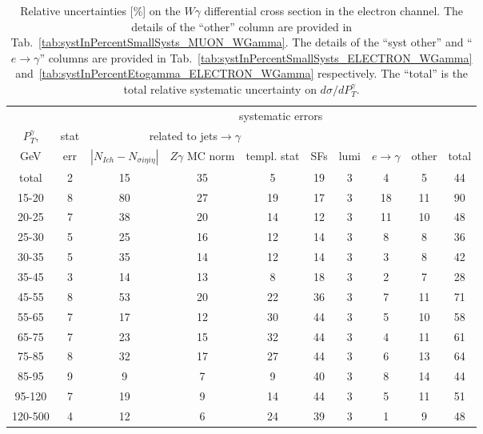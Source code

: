 \begin{table}[h]
  \scriptsize
  \begin{center}
  \caption{Relative uncertainties [\%] on the $W\gamma$ differential cross section in the electron channel. The details of the ``other'' column are provided in Tab.~\ref{tab:systInPercentSmallSysts_MUON_WGamma}. The details of the ``syst other'' and ``$e\rightarrow\gamma$'' columns are provided in Tab.~\ref{tab:systInPercentSmallSysts_ELECTRON_WGamma} and~\ref{tab:systInPercentEtogamma_ELECTRON_WGamma} respectively. The ``total'' is the total relative systematic uncertainty on $d\sigma/dP_T^{\gamma}$.}
   \begin{tabular}{|c|c|c|c|c|c|c|c|c|c|}
   \hline
                   &     & \multicolumn{8}{|c|}{systematic errors}     \\
    $P_T^{\gamma}$,  & stat & \multicolumn{3}{|c|}{related to jets$\rightarrow\gamma$} &  &  &  &  & \\
    GeV           & err & $|N_{Ich}-N_{\sigma{i\eta i\eta}}|$ &$Z\gamma$ MC norm &templ. stat & SFs & lumi & $e\rightarrow\gamma$  & other & total\\ \hline
    total  & 2 & 15 & 35 & 5 & 19 & 3 & 4 & 5 & 44 \\ \hline
    15-20 & 8 & 80 & 27 & 19 & 17 & 3 & 18 & 11 & 90 \\ \hline
    20-25 & 7 & 38 & 20 & 14 & 12 & 3 & 11 & 10 & 48 \\ \hline
    25-30 & 5 & 25 & 16 & 12 & 14 & 3 & 8 & 8 & 36 \\ \hline
    30-35 & 5 & 35 & 14 & 12 & 14 & 3 & 3 & 8 & 42 \\ \hline
    35-45 & 3 & 14 & 13 & 8 & 18 & 3 & 2 & 7 & 28 \\ \hline
    45-55 & 8 & 53 & 20 & 22 & 36 & 3 & 7 & 11 & 71 \\ \hline
    55-65 & 7 & 17 & 12 & 30 & 44 & 3 & 5 & 10 & 58 \\ \hline
    65-75 & 7 & 23 & 15 & 32 & 44 & 3 & 4 & 11 & 61 \\ \hline
    75-85 & 8 & 32 & 17 & 27 & 44 & 3 & 6 & 13 & 64 \\ \hline
    85-95 & 9 & 9 & 7 & 9 & 40 & 3 & 8 & 14 & 44 \\ \hline
    95-120 & 7 & 19 & 9 & 14 & 44 & 3 & 5 & 11 & 51 \\ \hline
    120-500 & 4 & 12 & 6 & 24 & 39 & 3 & 1 & 9 & 48 \\ \hline
  \end{tabular}
  \label{tab:systInPercent_ELECTRON_WGamma}
  \end{center}
\end{table}

